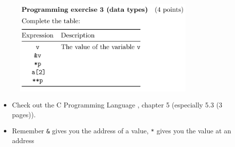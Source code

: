 \documentclass[10pt]{beamer}
\begin{document}
\begin{frame}{}
         \begin{figure}
          \includegraphics[keepaspectratio, width=0.8\textwidth, height=0.8\textheight-2\baselineskip-2\baselineskip]{img/102_ex5.png} \\
        \end{figure}
        \begin{itemize}
         \item Check out the C Programming Language \autocite{kernighan2006c}, chapter 5 (especially 5.3 (3 pages)).
         \item Remember \texttt{&} gives you the address of a value, \texttt{*} gives you the value at an address
        \end{itemize}
        \framebreak 
        

\end{frame}
\end{document}
